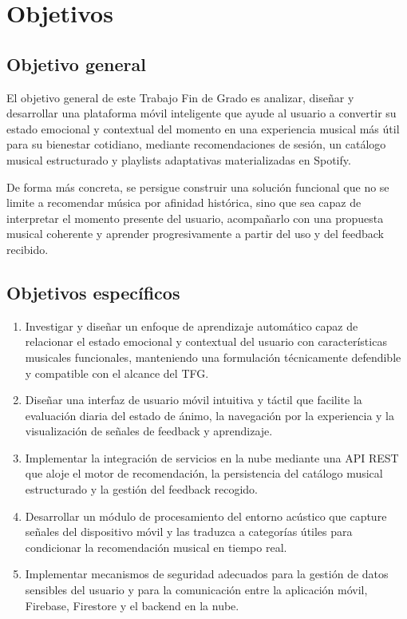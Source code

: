 \chapter{Objetivos}
\label{ch:objetivos}


\section{Objetivo general}
\label{sec:objetivo_general}

El objetivo general de este Trabajo Fin de Grado es analizar, diseñar y desarrollar una plataforma móvil inteligente que ayude al usuario a convertir su estado emocional y contextual del momento en una experiencia musical más útil para su bienestar cotidiano, mediante recomendaciones de sesión, un catálogo musical estructurado y playlists adaptativas materializadas en Spotify.

De forma más concreta, se persigue construir una solución funcional que no se limite a recomendar música por afinidad histórica, sino que sea capaz de interpretar el momento presente del usuario, acompañarlo con una propuesta musical coherente y aprender progresivamente a partir del uso y del feedback recibido.

\section{Objetivos específicos}
\label{sec:objetivos_especificos}

\begin{enumerate}[label=OE\arabic*.]
    \item Investigar y diseñar un enfoque de aprendizaje automático capaz de relacionar el estado emocional y contextual del usuario con características musicales funcionales, manteniendo una formulación técnicamente defendible y compatible con el alcance del TFG.
    \item Diseñar una interfaz de usuario móvil intuitiva y táctil que facilite la evaluación diaria del estado de ánimo, la navegación por la experiencia y la visualización de señales de feedback y aprendizaje.
    \item Implementar la integración de servicios en la nube mediante una API REST que aloje el motor de recomendación, la persistencia del catálogo musical estructurado y la gestión del feedback recogido.
    \item Desarrollar un módulo de procesamiento del entorno acústico que capture señales del dispositivo móvil y las traduzca a categorías útiles para condicionar la recomendación musical en tiempo real.
    \item Implementar mecanismos de seguridad adecuados para la gestión de datos sensibles del usuario y para la comunicación entre la aplicación móvil, Firebase, Firestore y el backend en la nube.
\end{enumerate}

